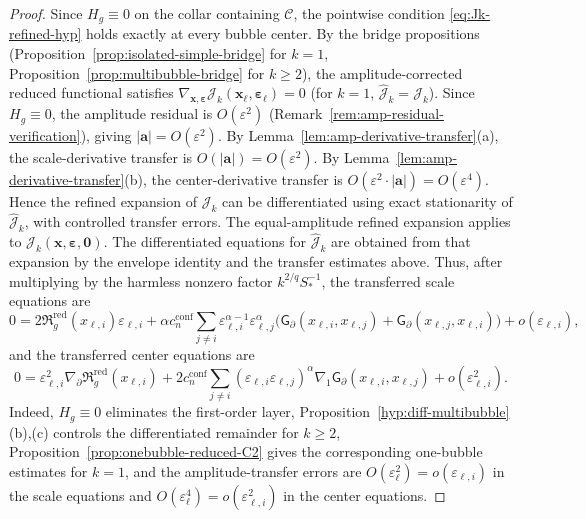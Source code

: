 \documentclass[11pt,reqno,a4paper]{amsart}
\numberwithin{equation}{section}
\theoremstyle{plain}
\theoremstyle{remark}
\theoremstyle{plain}
\begin{document}
\begin{proof}
Since $H_g\equiv0$ on the collar containing $\mathcal C$, the pointwise condition \eqref{eq:Jk-refined-hyp}
holds exactly at every bubble center.
By the bridge propositions
(Proposition~\ref{prop:isolated-simple-bridge} for $k=1$,
Proposition~\ref{prop:multibubble-bridge} for $k\ge2$),
the amplitude-corrected reduced functional satisfies
$\nabla_{\mathbf x,\boldsymbol\varepsilon}\hat{\mathcal J}_k
(\mathbf x_\ell,\boldsymbol\varepsilon_\ell)=0$
(for $k=1$, $\hat{\mathcal J}_k=\mathcal J_k$).
Since $H_g\equiv0$, the amplitude residual is $O(\varepsilon^2)$
(Remark~\ref{rem:amp-residual-verification}), giving $|\mathbf a|=O(\varepsilon^2)$.
By Lemma~\ref{lem:amp-derivative-transfer}\textup{(a)},
the scale-derivative transfer is $O(|\mathbf a|)=O(\varepsilon^2)$.
By Lemma~\ref{lem:amp-derivative-transfer}\textup{(b)},
the center-derivative transfer is $O(\varepsilon^2\cdot|\mathbf a|)=O(\varepsilon^4)$.
Hence the refined expansion of $\mathcal J_k$ can be differentiated
using exact stationarity of $\hat{\mathcal J}_k$, with controlled transfer errors.
The equal-amplitude refined expansion applies to $\mathcal J_k(\mathbf x,\boldsymbol\varepsilon,\mathbf0)$.
The differentiated equations for $\hat{\mathcal J}_k$ are obtained from that expansion by the envelope identity
and the transfer estimates above.  Thus, after multiplying by the harmless nonzero factor
$k^{2/q}S_\ast^{-1}$, the transferred scale equations are
\begin{equation}\label{eq:threshold-next-scale-transferred}
0=
2\mathfrak R_g^{\mathrm{red}}(x_{\ell,i})\varepsilon_{\ell,i}
+\alpha c_n^{\mathrm{conf}}\sum_{j\ne i}
\varepsilon_{\ell,i}^{\alpha-1}\varepsilon_{\ell,j}^{\alpha}
\bigl(\mathsf G_\partial(x_{\ell,i},x_{\ell,j})+
\mathsf G_\partial(x_{\ell,j},x_{\ell,i})\bigr)
+o(\varepsilon_{\ell,i}),
\end{equation}
and the transferred center equations are
\begin{equation}\label{eq:threshold-next-center-transferred}
0=
\varepsilon_{\ell,i}^2\nabla_\partial\mathfrak R_g^{\mathrm{red}}(x_{\ell,i})
+2c_n^{\mathrm{conf}}\sum_{j\ne i}
(\varepsilon_{\ell,i}\varepsilon_{\ell,j})^\alpha
\nabla_1\mathsf G_\partial(x_{\ell,i},x_{\ell,j})
+o(\varepsilon_{\ell,i}^2).
\end{equation}
Indeed, $H_g\equiv0$ eliminates the first-order layer, Proposition~\ref{hyp:diff-multibubble}\textup{(b),(c)}
controls the differentiated remainder for $k\ge2$, Proposition~\ref{prop:onebubble-reduced-C2} gives the
corresponding one-bubble estimates for $k=1$, and the amplitude-transfer errors are
$O(\varepsilon_\ell^2)=o(\varepsilon_{\ell,i})$ in the scale equations and
$O(\varepsilon_\ell^4)=o(\varepsilon_{\ell,i}^2)$ in the center equations.


\end{proof}
\end{document}
